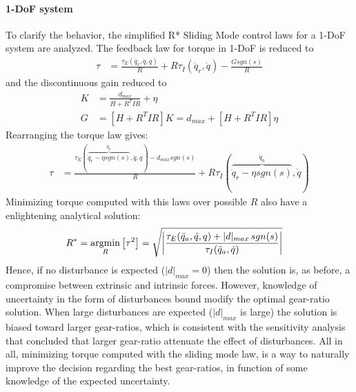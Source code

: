 \paragraph{1-DoF system} 

To clarify the behavior, the simplified R* Sliding Mode control laws for a 1-DoF system are analyzed. The feedback law for torque in 1-DoF is reduced to 
%
\begin{align}
	\tau &=  \frac{\tau_{E}(\ddot{q}_r,\dot{q},q)}{R} 
	+ R \tau_{I}(\ddot{q}_r,\dot{q})
  - \frac{G sgn( s ) }{R} 
\end{align}
%
and the discontinuous gain reduced to 
%
\begin{align}
K &= \frac{d_{max}}{H + R^T I R} + \eta \\
G &= \left[ H + R^T I R \right] K  =  d_{max} + \left[ H + R^T I R \right] \eta 
\end{align}
%
Rearranging the torque law gives:
%
\begin{align}
	\tau &=  \frac{\tau_{E}( \overbrace{ \ddot{q}_r - \eta sgn( s ) }^{\ddot{q}_a},\dot{q},q) - d_{max} sgn( s )  }{R} 
	+ R \tau_{I}(\overbrace{\ddot{q}_r - \eta sgn( s )}^{\ddot{q}_a} ,\dot{q})
\end{align}
%
Minimizing torque computed with this laws over possible $R$ also have a enlightening analytical solution:
%
\begin{align}
	R^{*} &= \operatornamewithlimits{argmin}\limits_{R} \left[ \tau^2 \right] = \sqrt{ \left | \frac{\tau_{E}(\ddot{q}_a,\dot{q},q) + | d |_{max} \, sgn( s ) }{\tau_{I}(\ddot{q}_a,\dot{q})} \right |   } 
\label{eq:rstar_sliding}
\end{align}
Hence, if no disturbance is expected ($| d |_{max}=0$) then the solution is, as before, a compromise between extrinsic and intrinsic forces. However, knowledge of uncertainty in the form of disturbances bound modify the optimal gear-ratio solution. When large disturbances are expected ($| d |_{max}$ is large) the solution is biased toward larger gear-ratios, which is consistent with the sensitivity analysis that concluded that larger gear-ratio attenuate the effect of disturbances. All in all, minimizing torque computed with the sliding mode law, is a way to naturally improve the decision regarding the best gear-ratios, in function of some knowledge of the expected uncertainty.
%

